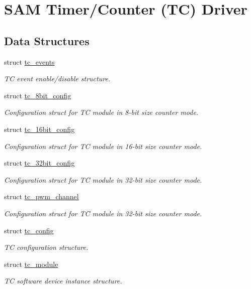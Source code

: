 \hypertarget{group__asfdoc__sam0__tc__group}{}\section{S\+AM Timer/\+Counter (TC) Driver}
\label{group__asfdoc__sam0__tc__group}
\subsection*{Data Structures}
\begin{DoxyCompactItemize}
\item 
struct \mbox{\hyperlink{structtc__events}{tc\+\_\+events}}
\begin{DoxyCompactList}\small\item\em TC event enable/disable structure. \end{DoxyCompactList}\item 
struct \mbox{\hyperlink{structtc__8bit__config}{tc\+\_\+8bit\+\_\+config}}
\begin{DoxyCompactList}\small\item\em Configuration struct for TC module in 8-\/bit size counter mode. \end{DoxyCompactList}\item 
struct \mbox{\hyperlink{structtc__16bit__config}{tc\+\_\+16bit\+\_\+config}}
\begin{DoxyCompactList}\small\item\em Configuration struct for TC module in 16-\/bit size counter mode. \end{DoxyCompactList}\item 
struct \mbox{\hyperlink{structtc__32bit__config}{tc\+\_\+32bit\+\_\+config}}
\begin{DoxyCompactList}\small\item\em Configuration struct for TC module in 32-\/bit size counter mode. \end{DoxyCompactList}\item 
struct \mbox{\hyperlink{structtc__pwm__channel}{tc\+\_\+pwm\+\_\+channel}}
\begin{DoxyCompactList}\small\item\em Configuration struct for TC module in 32-\/bit size counter mode. \end{DoxyCompactList}\item 
struct \mbox{\hyperlink{structtc__config}{tc\+\_\+config}}
\begin{DoxyCompactList}\small\item\em TC configuration structure. \end{DoxyCompactList}\item 
struct \mbox{\hyperlink{structtc__module}{tc\+\_\+module}}
\begin{DoxyCompactList}\small\item\em TC software device instance structure. \end{DoxyCompactList}\end{DoxyCompactItemize}
